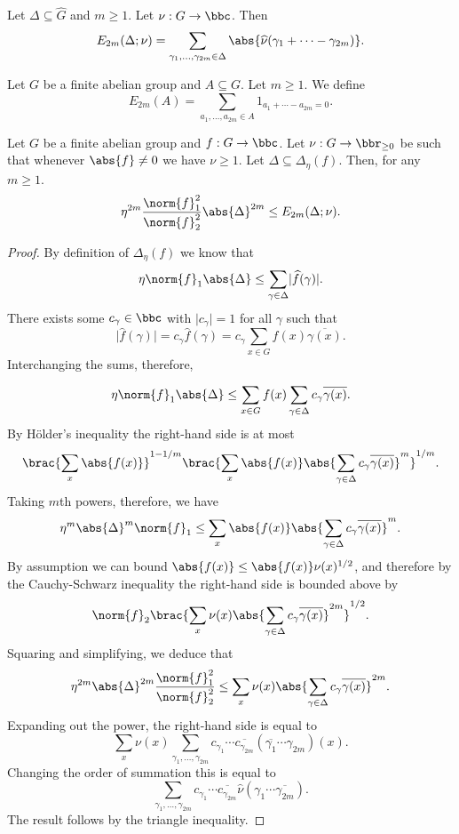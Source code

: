 \begin{definition}
\label{weight_energy}
\leanok
Let $\Delta\subseteq \widehat{G}$ and $m\geq 1$. Let $\nu:G\to \bbc$. Then
\[E_{2m}(\Delta;\nu)=\sum_{\gamma_1,\ldots,\gamma_{2m}\in \Delta}\abs{\widehat{\nu}(\gamma_1+\cdots-\gamma_{2m})}.\]
\end{definition}


\begin{definition}[Energy]
\label{energy}
\leanok
Let $G$ be a finite abelian group and $A\subseteq G$. Let $m\geq 1$. We define
\[E_{2m}(A)=\sum_{a_1,\ldots,a_{2m}\in A}1_{a_1+\cdots-a_{2m}=0}.\]
\end{definition}


\begin{lemma}
\label{general_hoelder}
\leanok
Let $G$ be a finite abelian group and $f:G\to\bbc$. Let $\nu:G\to \bbr_{\geq 0}$ be such that whenever $\abs{f}\neq 0$ we have $\nu \geq 1$. Let $\Delta\subseteq \Delta_\eta(f)$. Then, for any $m\geq 1$.
\[\eta^{2m}\frac{\norm{f}_1^2}{\norm{f}_2^2}\abs{\Delta}^{2m}\leq E_{2m}(\Delta;\nu).\]
\end{lemma}

\begin{proof}
\leanok
By definition of $\Delta_\eta(f)$ we know that
\[\eta\norm{f}_1\abs{\Delta}\leq \sum_{\gamma\in\Delta} \lvert \widehat{f}(\gamma)\rvert.\]
There exists some $c_\gamma\in\bbc$ with $\lvert c_\gamma\rvert=1$ for all $\gamma$ such that
\[\lvert \widehat{f}(\gamma)\rvert=c_\gamma\widehat{f}(\gamma)=c_\gamma \sum_{x\in G}f(x)\overline{\gamma(x)}.\]
Interchanging the sums, therefore,

\[\eta\norm{f}_1\abs{\Delta}\leq \sum_{x\in G}f(x)\sum_{\gamma\in\Delta} c_\gamma \overline{\gamma(x)}.\]
By H\"{o}lder's inequality the right-hand side is at most
\[\brac{\sum_x \abs{f(x)}}^{1-1/m}\brac{\sum_x \abs{f(x)}\abs{\sum_{\gamma\in\Delta}c_\gamma\overline{\gamma(x)}}^m}^{1/m}.\]
Taking $m$th powers, therefore, we have
\[\eta^m\abs{\Delta}^m\norm{f}_1\leq \sum_{x}\abs{f(x)}\abs{\sum_{\gamma\in\Delta}c_\gamma\overline{\gamma(x)}}^m.\]
By assumption we can bound $\abs{f(x)}\leq \abs{f(x)}\nu(x)^{1/2}$, and therefore by the Cauchy-Schwarz inequality the right-hand side is bounded above by
\[\norm{f}_2\brac{\sum_x \nu(x)\abs{\sum_{\gamma\in\Delta}c_\gamma\overline{\gamma(x)}}^{2m}}^{1/2}.\]
Squaring and simplifying, we deduce that
\[\eta^{2m}\abs{\Delta}^{2m}\frac{\norm{f}_1^2}{\norm{f}_2^2}\leq \sum_x \nu(x)\abs{\sum_{\gamma\in\Delta}c_\gamma\overline{\gamma(x)}}^{2m}.\]
Expanding out the power, the right-hand side is equal to
\[\sum_x \nu(x)\sum_{\gamma_1,\ldots,\gamma_{2m}}c_{\gamma_1}\cdots \overline{c_{\gamma_{2m}}} (\overline{\gamma_1}\cdots \gamma_{2m})(x).\]
Changing the order of summation this is equal to
\[\sum_{\gamma_1,\ldots,\gamma_{2m}}c_{\gamma_1}\cdots \overline{c_{\gamma_{2m}}}
\widehat{\nu}(\gamma_1\cdots \overline{\gamma_{2m}}).\]
The result follows by the triangle inequality.
\end{proof}


